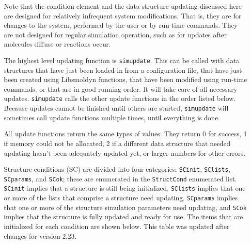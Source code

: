 \documentclass {scrbook}
\newcommand {\ttt} {\texttt}
\begin{document}
Note that the condition element and the data structure updating discussed here are designed for relatively infrequent system modifications. That is, they are for changes to the system, performed by the user or by run-time commands. They are not designed for regular simulation operation, such as for updates after molecules diffuse or reactions occur.

The highest level updating function is \ttt{simupdate}. This can be called with data structures that have just been loaded in from a configuration file, that have just been created using Libsmoldyn functions, that have been modified using run-time commands, or that are in good running order. It will take care of all necessary updates. \ttt{simupdate} calls the other update functions in the order listed below. Because updates cannot be finished until others are started, \ttt{simupdate} will sometimes call update functions multiple times, until everything is done.

All update functions return the same types of values. They return 0 for success, 1 if memory could not be allocated, 2 if a different data structure that needed updating hasn't been adequately updated yet, or larger numbers for other errors.

Structure conditions (SC) are divided into four categories: \ttt{SCinit}, \ttt{SClists}, \ttt{SCparams}, and \ttt{SCok}; these are enumerated in the \ttt{StructCond} enumerated list. \ttt{SCinit} implies that a structure is still being initialized, \ttt{SClists} implies that one or more of the lists that comprise a structure need updating, \ttt{SCparams} implies that one or more of the structure simulation parameters need updating, and \ttt{SCok} implies that the structure is fully updated and ready for use. The items that are initialized for each condition are shown below. This table was updated after changes for version 2.23.
\end{document}
